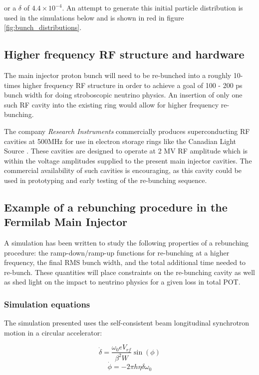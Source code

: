 or a $\delta$ of $4.4\times 10^{-4}$. An attempt to generate this initial particle distribution
is used in the simulations below and is shown in red in figure \ref{fig:bunch_distributions}.


\subsection{Higher frequency RF structure and hardware}

The main injector proton bunch will need to be re-bunched into a
roughly 10-times higher frequency RF structure in order to achieve a
goal of 100 - 200 ps bunch width for doing stroboscopic neutrino physics. An
insertion of only one such RF cavity into the existing ring would
allow for higher frequency re-bunching.

The company \textit{Research Instruments} commercially produces
superconducting RF cavities at 500MHz for use in electron storage
rings like the Canadian Light Source
\cite{nsls-cavity}\cite{cls_stampe}\cite{research_instruments}. These
cavities are designed to operate at 2 MV RF amplitude which is within the
voltage amplitudes supplied to the present main injector cavities.
 The commercial availability of such cavities is encouraging,
as this cavity could be used in prototyping and early testing of the
re-bunching sequence. 


\subsection{Example of a rebunching procedure in the Fermilab Main Injector}

A simulation has been written to study the following properties of a
rebunching procedure: the ramp-down/ramp-up functions for re-bunching
at a higher frequency, the final RMS bunch width, and the total
additional time needed to re-bunch. These quantities will place
constraints on the re-bunching cavity as well as shed light on the
impact to neutrino physics for a given loss in total POT.

\subsubsection{Simulation equations}

The simulation presented uses the self-consistent beam
longitudinal synchrotron motion in a circular accelerator:

\begin{equation}
\dot{\delta} = \frac{\omega_0 e V_{rf}}{\beta ^2 W}\sin(\phi) 
\end{equation}
\begin{equation}
\dot{\phi} = -2\pi h \eta \delta \omega_0
\end{equation}

